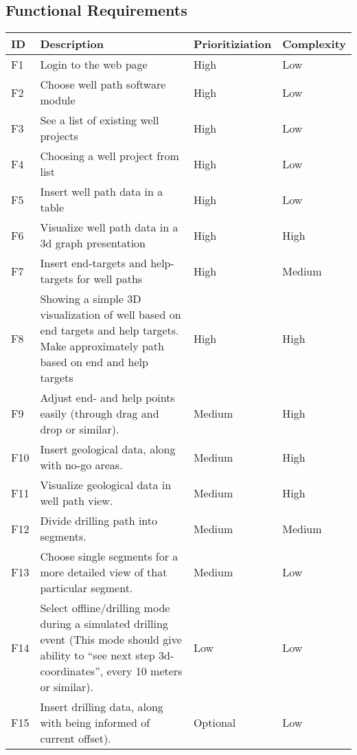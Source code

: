 \documentclass{report}
\begin{document}
\subsection{Functional Requirements} \label{subsec:functional_requirements}
\begin{tabular}{| l | p{5.9cm} | l | l |} \hline
ID & Description & Prioritiziation & Complexity \\ \hline
F1 & Login to the web page & High & Low \\ \hline
F2 & Choose well path software module & High & Low \\ \hline
F3 & See a list of existing well projects & High & Low \\ \hline
F4 & Choosing a well project from list & High & Low \\ \hline
F5 & Insert well path data in a table & High & Low \\ \hline
F6 & Visualize well path data in a 3d graph presentation & High & High \\ \hline
F7 & Insert end-targets and help-targets for well paths & High & Medium \\ \hline
F8 & Showing a simple 3D visualization of well based on end targets and help targets. Make approximately path based on end and help targets & High & High \\ \hline
F9 & Adjust end- and help points easily (through drag and drop or similar). & Medium & High \\ \hline
F10 & Insert geological data, along with no-go areas. & Medium & High \\ \hline
F11 & Visualize geological data in well path view. & Medium & High \\ \hline
F12 & Divide drilling path into segments. & Medium & Medium \\ \hline
F13 & Choose single segments for a more detailed view of that particular segment. & Medium & Low \\ \hline
F14 & Select offline/drilling mode during a simulated drilling event (This mode should give ability to “see next step 3d-coordinates”, every 10 meters or similar). & Low & Low \\ \hline
F15 & Insert drilling data, along with being informed of current offset). & Optional & Low \\ \hline
\end{tabular}
\end{document}
